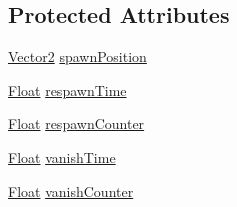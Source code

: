 \subsection*{Protected Attributes}
\begin{DoxyCompactItemize}
\item 
\hyperlink{classZeta_1_1Vector2}{Vector2} \hyperlink{classZeta_1_1Enemy_a2f1534012f4fc7b82c43304280c1d8d6}{spawn\+Position}
\item 
\hyperlink{namespaceZeta_a1e0a1265f9b3bd3075fb0fabd39088ba}{Float} \hyperlink{classZeta_1_1Enemy_ad36f629c50a6aa803d35c91d1614a08a}{respawn\+Time}
\item 
\hyperlink{namespaceZeta_a1e0a1265f9b3bd3075fb0fabd39088ba}{Float} \hyperlink{classZeta_1_1Enemy_af9dca0ba9b175eb91b23fc4751b50cc2}{respawn\+Counter}
\item 
\hyperlink{namespaceZeta_a1e0a1265f9b3bd3075fb0fabd39088ba}{Float} \hyperlink{classZeta_1_1Enemy_ada5f42b351b3ba7fbb72ca3b87dcc7f3}{vanish\+Time}
\item 
\hyperlink{namespaceZeta_a1e0a1265f9b3bd3075fb0fabd39088ba}{Float} \hyperlink{classZeta_1_1Enemy_a57fec4d209c1cee8f0a9dc05f09fc977}{vanish\+Counter}
\end{DoxyCompactItemize}


